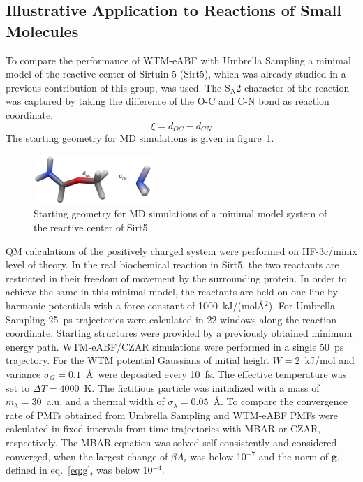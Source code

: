\subsection{Illustrative Application to Reactions of Small Molecules}
To compare the performance of WTM-eABF with Umbrella Sampling a minimal model of the reactive center of Sirtuin 5 (Sirt5), which was already studied in a previous contribution of this group,\autocite{von2019finding} was used.
The S$_N$2 character of the reaction was captured by taking the difference of the O-C and C-N bond as reaction coordinate.
\begin{equation}
  \xi=d_{OC}-d_{CN}
\end{equation}
The starting geometry for MD simulations is given in figure~\ref{fig:cl-f-eth}.
\begin{figure}[H]
    \centering
    \includegraphics[width=0.4\textwidth]{bilder/cl-f-eth}
    \caption{Starting geometry for MD simulations of a minimal model system of the reactive center of Sirt5.}
\label{fig:cl-f-eth}%
\end{figure}
QM calculations of the positively charged system were performed on HF-3c/minix\autocite{sure2013corrected} level of theory.
In the real biochemical reaction in Sirt5, the two reactants are restricted in their freedom of movement by the surrounding protein. In order to achieve the same in this minimal model, the reactants are held on one line by harmonic potentials with a force constant of 1000~kJ/(mol\AA$^2$).
For Umbrella Sampling 25~ps trajectories were calculated in 22 windows along the reaction coordinate.
Starting structures were provided by a previously obtained minimum energy path.
WTM-eABF/CZAR simulations were performed in a single 50~ps trajectory.
For the WTM potential Gaussians of initial height $W=2$~kJ/mol and variance $\sigma_G=0.1$~\AA~were deposited every 10~fs.
The effective temperature was set to $\Delta T=4000$~K.
The fictitious particle was initialized with a mass of $m_\lambda=30$~a.u. and a thermal width of $\sigma_\lambda=0.05$~\AA.
To compare the convergence rate of PMFs obtained from Umbrella Sampling and WTM-eABF PMFs were calculated in fixed intervals from time trajectories with MBAR or CZAR, respectively.
The MBAR equation was solved self-consistently and considered converged, when the largest change of $\beta A_i$ was below 10$^{-7}$ and the norm of $\textbf{g}$, defined in eq.~\ref{eq:g}, was below 10$^{-4}$.
